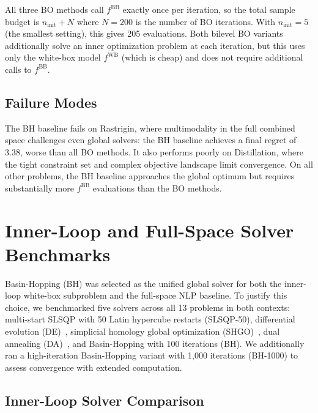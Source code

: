 \documentclass[12pt,a4paper]{article}%
\theoremstyle{plain}%
\theoremstyle{remark}%
\theoremstyle{definition}%
\def\WB{\mathrm{WB}}
\def\BB{\mathrm{BB}}
\begin{document}
\begin{appendices}
All three BO methods call $f^{\BB}$ exactly once per iteration, so the total sample budget is $n_\text{init} + N$ where $N=200$ is the number of BO iterations. With $n_\text{init} = 5$ (the smallest setting), this gives 205 evaluations. Both bilevel BO variants additionally solve an inner optimization problem at each iteration, but this uses only the white-box model $f^{\WB}$ (which is cheap) and does not require additional calls to $f^{\BB}$.

\subsection{Failure Modes}\label{subsec:bh_failures}

The BH baseline fails on Rastrigin, where multimodality in the full combined space challenges even global solvers: the BH baseline achieves a final regret of 3.38, worse than all BO methods. It also performs poorly on Distillation, where the tight constraint set and complex objective landscape limit convergence. On all other problems, the BH baseline approaches the global optimum but requires substantially more $f^{\BB}$ evaluations than the BO methods.

\section{Inner-Loop and Full-Space Solver Benchmarks}\label{sec:solver_benchmarks}

Basin-Hopping (BH) was selected as the unified global solver for both the inner-loop white-box subproblem and the full-space NLP baseline. To justify this choice, we benchmarked five solvers across all 13 problems in both contexts: multi-start SLSQP with 50 Latin hypercube restarts (SLSQP-50), differential evolution (DE)~\cite{storn1997differential}, simplicial homology global optimization (SHGO)~\cite{endres2018simplicial}, dual annealing (DA)~\cite{xiang1997generalized}, and Basin-Hopping with 100 iterations (BH). We additionally ran a high-iteration Basin-Hopping variant with 1{,}000 iterations (BH-1000) to assess convergence with extended computation.

\subsection{Inner-Loop Solver Comparison}\label{subsec:inner_solver}


\end{appendices}
\end{document}
